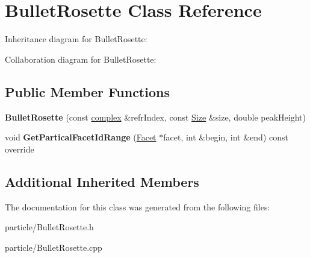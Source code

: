 \hypertarget{class_bullet_rosette}{}\section{Bullet\+Rosette Class Reference}
\label{class_bullet_rosette}


Inheritance diagram for Bullet\+Rosette\+:


Collaboration diagram for Bullet\+Rosette\+:
\subsection*{Public Member Functions}
\begin{DoxyCompactItemize}
\item 
\mbox{\label{class_bullet_rosette_ad965a987a9247a0a3b3463b41d9856a9}} 
{\bfseries Bullet\+Rosette} (const \mbox{\hyperlink{classcomplex}{complex}} \&refr\+Index, const \mbox{\hyperlink{struct_size}{Size}} \&size, double peak\+Height)
\item 
\mbox{\label{class_bullet_rosette_ae5b1763e464116c8429b8502d3cb07fa}} 
void {\bfseries Get\+Partical\+Facet\+Id\+Range} (\mbox{\hyperlink{class_facet}{Facet}} $\ast$facet, int \&begin, int \&end) const override
\end{DoxyCompactItemize}
\subsection*{Additional Inherited Members}


The documentation for this class was generated from the following files\+:\begin{DoxyCompactItemize}
\item 
particle/Bullet\+Rosette.\+h\item 
particle/Bullet\+Rosette.\+cpp\end{DoxyCompactItemize}
